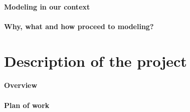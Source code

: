 \documentclass[english]{article}
\begin{document}
\paragraph{Modeling in our context}


\paragraph{Why, what and how proceed to modeling?}


\section{Description of the project}


\paragraph{Overview}


\paragraph{Plan of work}



\end{document}
